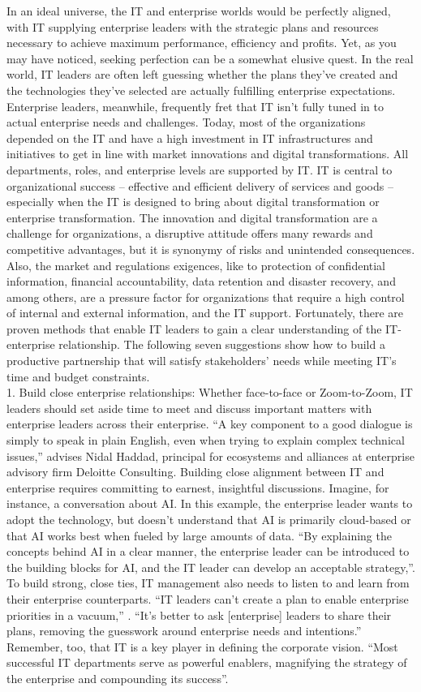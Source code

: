 \documentclass[12pt]{article}
\begin{document}
In an ideal universe, the IT and enterprise worlds would be perfectly aligned, with IT supplying enterprise leaders with the strategic plans and resources necessary to achieve maximum performance, efficiency and profits. Yet, as you may have noticed, seeking perfection can be a somewhat elusive quest. In the real world, IT leaders are often left guessing whether the plans they’ve created and the technologies they’ve selected are actually fulfilling enterprise expectations. Enterprise leaders, meanwhile, frequently fret that IT isn’t fully tuned in to actual enterprise needs and challenges. Today, most of the organizations depended on the IT and have a high investment in IT infrastructures and initiatives to get in line with market innovations and digital transformations. All departments, roles, and enterprise levels are supported by IT. IT is central to organizational success – effective and efficient delivery of services and goods – especially when the IT is designed to bring about digital transformation or enterprise transformation. The innovation and digital transformation are a challenge for organizations, a disruptive attitude offers many rewards and competitive advantages, but it is synonymy of risks and unintended consequences. Also, the market and regulations exigences, like to protection of confidential information, financial accountability, data retention and disaster recovery, and among others, are a pressure factor for organizations that require a high control of internal and external information, and the IT support. Fortunately, there are proven methods that enable IT leaders to gain a clear understanding of the IT-enterprise relationship. The following seven suggestions show how to build a productive partnership that will satisfy stakeholders’ needs while meeting IT’s time and budget constraints.
\\
1. Build close enterprise relationships: Whether face-to-face or Zoom-to-Zoom, IT leaders should set aside time to meet and discuss important matters with enterprise leaders across their enterprise. “A key component to a good dialogue is simply to speak in plain English, even when trying to explain complex technical issues,” advises Nidal Haddad, principal for ecosystems and alliances at enterprise advisory firm Deloitte Consulting. Building close alignment between IT and enterprise requires committing to earnest, insightful discussions. Imagine, for instance, a conversation about AI. In this example, the enterprise leader wants to adopt the technology, but doesn’t understand that AI is primarily cloud-based or that AI works best when fueled by large amounts of data. “By explaining the concepts behind AI in a clear manner, the enterprise leader can be introduced to the building blocks for AI, and the IT leader can develop an acceptable strategy,”. To build strong, close ties, IT management also needs to listen to and learn from their enterprise counterparts. “IT leaders can’t create a plan to enable enterprise priorities in a vacuum,” . “It’s better to ask [enterprise] leaders to share their plans, removing the guesswork around enterprise needs and intentions.” Remember, too, that IT is a key player in defining the corporate vision. “Most successful IT departments serve as powerful enablers, magnifying the strategy of the enterprise and compounding its success”.
\end{document}
